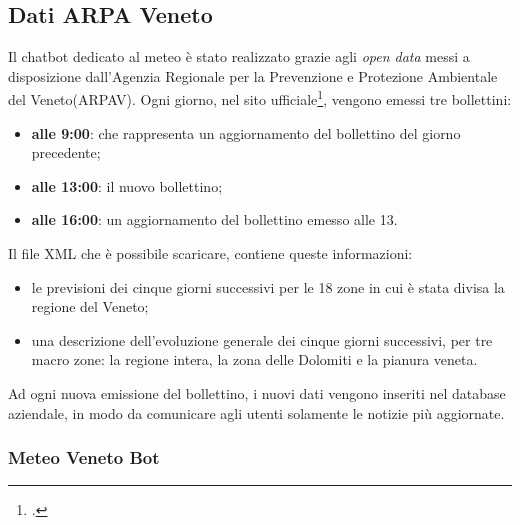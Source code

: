 \subsection{Dati ARPA Veneto}
Il \gls{chatbot} dedicato al meteo è stato realizzato grazie agli \emph{open data} messi a disposizione dall'Agenzia Regionale per la Prevenzione e Protezione Ambientale del Veneto(ARPAV). Ogni giorno, nel sito ufficiale\footcite{arpav}, vengono emessi tre bollettini:
\begin{itemize}
	\item \textbf{alle 9:00}: che rappresenta un aggiornamento del bollettino del giorno precedente;
	\item \textbf{alle 13:00}: il nuovo bollettino;
	\item \textbf{alle 16:00}: un aggiornamento del bollettino emesso alle 13.
\end{itemize} 

Il file \gls{XML} che è possibile scaricare, contiene queste informazioni:
\begin{itemize}
	\item le previsioni dei cinque giorni successivi per le 18 zone in cui è stata divisa la regione del Veneto;
	\item una descrizione dell'evoluzione generale dei cinque giorni successivi, per tre macro zone: la regione intera, la zona delle Dolomiti e la pianura veneta.
\end{itemize}

Ad ogni nuova emissione del bollettino, i nuovi dati vengono inseriti nel database aziendale, in modo da comunicare agli utenti solamente le notizie più aggiornate.

\subsubsection{Meteo Veneto Bot}

